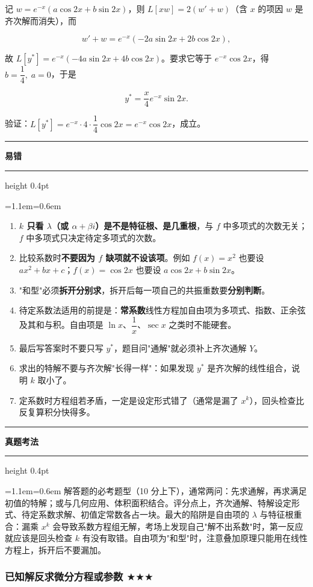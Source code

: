 \documentclass[11pt,openany,UTF8]{ctexbook}
\newcommand{\callouthead}[2]{%
  \par\addvspace{7pt}\noindent
  {\color{#1}\rule[-0.15em]{3pt}{1.05em}}\hspace{0.5em}%
  {\bfseries\color{#1}#2}\par\nobreak\vspace{-0.35em}%
  {\color{rulesep}\hrule height 0.4pt}\nobreak\vspace{0.45em}%
  \begingroup\small\setlength{\parindent}{0pt}%
  \leftskip=1.1em\rightskip=0.6em\noindent\ignorespaces}
\newcommand{\calloutend}{\par\endgroup\addvspace{7pt}}
\newenvironment{callwarn}[1]{\callouthead{warnbar}{#1}}{\calloutend}
\newenvironment{callexam}[1]{\callouthead{exambar}{#1}}{\calloutend}
\begin{document}
记 $w=e^{-x}\left(a\cos 2x+b\sin 2x\right)$，则 $L\left[xw\right]=2\left(w'+w\right)$（含 $x$ 的项因 $w$ 是齐次解而消失），而

\[w'+w=e^{-x}\left(-2a\sin 2x+2b\cos 2x\right),\]

故 $L\left[y^{*}\right]=e^{-x}\left(-4a\sin 2x+4b\cos 2x\right)$。要求它等于 $e^{-x}\cos 2x$，得 $b=\dfrac14,\;a=0$，于是

\[y^{*}=\frac{x}{4}e^{-x}\sin 2x .\]

验证：$L\left[y^{*}\right]=e^{-x}\cdot 4\cdot\dfrac14\cos 2x=e^{-x}\cos 2x$，成立。

\begin{callwarn}{易错}
\begin{enumerate}
\item \textbf{$k$ 只看 $\lambda$（或 $\alpha+\beta i$）是不是特征根、是几重根}，与 $f$ 中多项式的次数无关；$f$ 中多项式只决定待定多项式的次数。
\item 比较系数时\textbf{不要因为 $f$ 缺项就不设该项}。例如 $f(x)=x^{2}$ 也要设 $ax^{2}+bx+c$；$f(x)=\cos 2x$ 也要设 $a\cos 2x+b\sin 2x$。
\item "和型"必须\textbf{拆开分别求}，拆开后每一项自己的共振重数要\textbf{分别判断}。
\item 待定系数法适用的前提是：\textbf{常系数}线性方程加自由项为多项式、指数、正余弦及其和与积。自由项是 $\ln x$、$\dfrac1x$、$\sec x$ 之类时不能硬套。
\item 最后写答案时不要只写 $y^{*}$，题目问"通解"就必须补上齐次通解 $Y$。
\item 求出的特解不要与齐次解"长得一样"：如果发现 $y^{*}$ 是齐次解的线性组合，说明 $k$ 取小了。
\item 定系数时方程组若矛盾，一定是设定形式错了（通常是漏了 $x^{k}$），回头检查比反复算积分快得多。
\end{enumerate}
\end{callwarn}

\begin{callexam}{真题考法}
解答题的必考题型（10 分上下），通常两问：先求通解，再求满足初值的特解；或与几何应用、体积面积结合。评分点上，齐次通解、特解设定形式、待定系数求解、初值定常数各占一块。最大的陷阱是自由项的 $\lambda$ 与特征根重合：漏乘 $x^{k}$ 会导致系数方程组无解，考场上发现自己"解不出系数"时，第一反应就应该是回头检查 $k$ 有没有取错。自由项为"和型"时，注意叠加原理只能用在线性方程上，拆开后不要漏加。

\end{callexam}

\subsubsection{已知解反求微分方程或参数 $\bigstar$$\bigstar$$\bigstar$}
\end{document}
